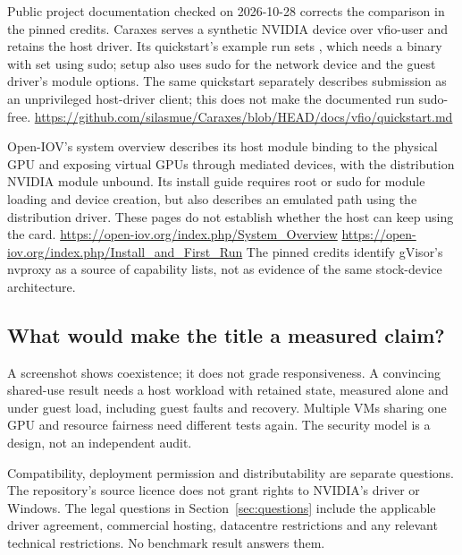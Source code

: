 \doc Public project documentation checked on 2026-10-28 corrects the comparison in the
pinned credits. Caraxes serves a synthetic NVIDIA device over vfio-user and retains the host
driver. Its quickstart's example run sets , which needs a binary
with  set using sudo; setup also uses sudo for the network device and
the guest driver's module options. The same quickstart separately describes submission as an
unprivileged host-driver client; this does not make the documented run sudo-free.
\url{https://github.com/silasmue/Caraxes/blob/HEAD/docs/vfio/quickstart.md}

\doc Open-IOV's system overview describes its host module binding to the physical GPU and
exposing virtual GPUs through mediated devices, with the distribution NVIDIA module unbound.
Its install guide requires root or sudo for module loading and device creation, but also
describes an emulated path using the distribution driver. These pages do not establish
whether the host can keep using the card.
\url{https://open-iov.org/index.php/System_Overview}
\url{https://open-iov.org/index.php/Install_and_First_Run}
The pinned credits identify gVisor's nvproxy as a source of capability lists,
not as evidence of the same stock-device architecture.

\subsection{What would make the title a measured claim?}

\unmeasured A screenshot shows coexistence; it does not grade responsiveness. A convincing
shared-use result needs a host workload with retained state, measured alone and under guest
load, including guest faults and recovery. Multiple VMs sharing one GPU and resource fairness
need different tests again. The security model is a design, not an independent audit.

\doc Compatibility, deployment permission and distributability are separate questions.
The repository's source licence does not grant rights to NVIDIA's driver or Windows. The
legal questions in Section~\ref{sec:questions} include the applicable driver agreement,
commercial hosting, datacentre restrictions and any relevant technical restrictions.
No benchmark result answers them.
